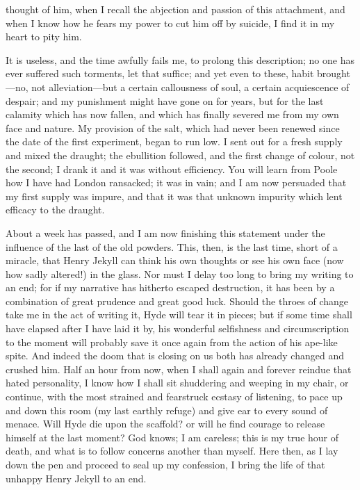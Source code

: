 \documentclass[12pt,openright]{book}
\begin{document}
thought of him, when I recall the abjection and passion of this attachment, and when I know how he fears my power to cut him off by suicide, I find it in my heart to pity him.

It is useless, and the time awfully fails me, to prolong this description; no one has ever suffered such torments, let that suffice; and yet even to these, habit brought—no, not alleviation—but a certain callousness of soul, a certain acquiescence of despair; and my punishment might have gone on for years, but for the last calamity which has now fallen, and which has finally severed me from my own face and nature. My provision of the salt, which had never been renewed since the date of the first experiment, began to run low. I sent out for a fresh supply and mixed the draught; the ebullition followed, and the first change of colour, not the second; I drank it and it was without efficiency. You will learn from Poole how I have had London ransacked; it was in vain; and I am now persuaded that my first supply was impure, and that it was that unknown impurity which lent efficacy to the draught.

About a week has passed, and I am now finishing this statement under the influence of the last of the old powders. This, then, is the last time, short of a miracle, that Henry Jekyll can think his own thoughts or see his own face (now how sadly altered!) in the glass. Nor must I delay too long to bring my writing to an end; for if my narrative has hitherto escaped destruction, it has been by a combination of great prudence and great good luck. Should the throes of change take me in the act of writing it, Hyde will tear it in pieces; but if some time shall have elapsed after I have laid it by, his wonderful selfishness and circumscription to the moment will probably save it once again from the action of his ape-like spite. And indeed the doom that is closing on us both has already changed and crushed him. Half an hour from now, when I shall again and forever reindue that hated personality, I know how I shall sit shuddering and weeping in my chair, or continue, with the most strained and fearstruck ecstasy of listening, to pace up and down this room (my last earthly refuge) and give ear to every sound of menace. Will Hyde die upon the scaffold? or will he find courage to release himself at the last moment? God knows; I am careless; this is my true hour of death, and what is to follow concerns another than myself. Here then, as I lay down the pen and proceed to seal up my confession, I bring the life of that unhappy Henry Jekyll to an end.



\backmatter

\end{document}
